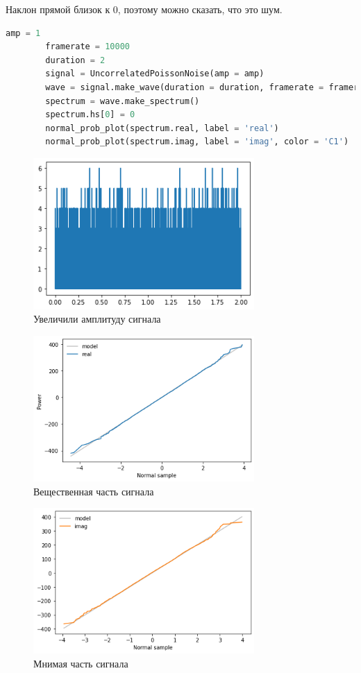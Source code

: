 \documentclass[a4paper, 12pt]{report}
\begin{document}
	Наклон прямой близок к 0, поэтому можно сказать, что это  шум.
	\begin{lstlisting}[language=Python,caption=Сравнение спектра с гауссовым шумом]
		amp = 1
		framerate = 10000
		duration = 2
		signal = UncorrelatedPoissonNoise(amp = amp)
		wave = signal.make_wave(duration = duration, framerate = framerate)
		spectrum = wave.make_spectrum()
		spectrum.hs[0] = 0
		normal_prob_plot(spectrum.real, label = 'real')
		normal_prob_plot(spectrum.imag, label = 'imag', color = 'C1')
	\end{lstlisting}
	\begin{figure}[H]
		\centering
		\includegraphics[width=0.75\textwidth]{result5.png}
		\caption{Увеличили амплитуду сигнала}
		\label{fig:result5}
	\end{figure}
	\begin{figure}[H]
		\centering
		\includegraphics[width=0.75\textwidth]{result6.png}
		\caption{Вещественная часть сигнала}
		\label{fig:result6}
	\end{figure}
	\begin{figure}[H]
		\centering
		\includegraphics[width=0.75\textwidth]{result7.png}
		\caption{Мнимая часть сигнала}
		\label{fig:result7}
	\end{figure}	
\end{document}

